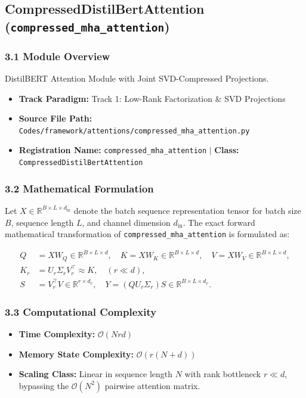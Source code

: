 \subsection{CompressedDistilBertAttention (\texttt{compressed\_mha\_attention})}
\label{sec:app_module_compressed_mha_attention}

\subsubsection*{3.1 Module Overview}
DistilBERT Attention Module with Joint SVD-Compressed Projections.
\begin{itemize}
    \item \textbf{Track Paradigm:} Track 1: Low-Rank Factorization & SVD Projections
    \item \textbf{Source File Path:} \texttt{Codes/framework/attentions/compressed\_mha\_attention.py}
    \item \textbf{Registration Name:} \texttt{compressed\_mha\_attention} $\mid$ \textbf{Class:} \texttt{CompressedDistilBertAttention}
\end{itemize}

\subsubsection*{3.2 Mathematical Formulation}
Let $X \in \mathbb{R}^{B \times L \times d_{\text{in}}}$ denote the batch sequence representation tensor for batch size $B$, sequence length $L$, and channel dimension $d_{\text{in}}$. The exact forward mathematical transformation of \texttt{compressed\_mha\_attention} is formulated as:

\begin{align}
Q &= X W_Q \in \mathbb{R}^{B \times L \times d}, \quad K = X W_K \in \mathbb{R}^{B \times L \times d}, \quad V = X W_V \in \mathbb{R}^{B \times L \times d}, \\
K_r &= U_r \Sigma_r V_r^\top \approx K, \quad (r \ll d), \\
S &= V_r^\top V \in \mathbb{R}^{r \times d_v}, \quad Y = (Q U_r \Sigma_r) S \in \mathbb{R}^{B \times L \times d_v}.
\end{align}


\subsubsection*{3.3 Computational Complexity}
\begin{itemize}
    \item \textbf{Time Complexity:} $\mathcal{O}(N r d)$
    \item \textbf{Memory State Complexity:} $\mathcal{O}(r(N + d))$
    \item \textbf{Scaling Class:} Linear in sequence length $N$ with rank bottleneck $r \ll d$, bypassing the $\mathcal{O}(N^2)$ pairwise attention matrix.
\end{itemize}

